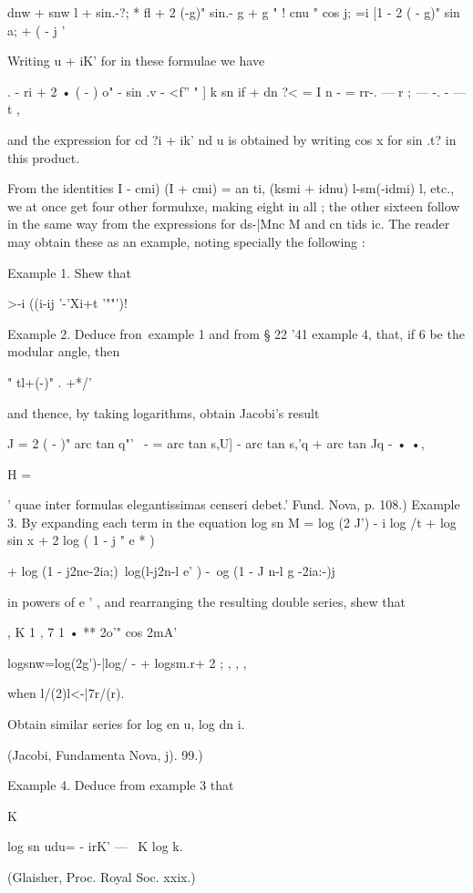 dnw + snw l + sin.-?; * fl + 2 (-g)" sin.- g + g " ! cnu " cos j; =i
[1 - 2 ( - g)" sin a; + ( - j '

Writing u + iK' for in these formulae we have

. - ri + 2 • ( - ) o" - sin .v - <f'' " ] k sn if + dn ?< = I n - =
rr-. — r ; — -. - — t ,

and the expression for cd ?i + ik' nd u is obtained by writing cos x
for sin .t? in this product.

From the identities I - cmi) (I + cmi) = an ti, (ksmi + idnu)
l-sm(-idmi) l, etc., we at once get four other formuhxe, making eight
in all ; the other sixteen follow in the same way from the expressions
for ds-|Mnc M and cn tids ic. The reader may obtain these as an
example, noting specially the following :

Example 1. Shew that

  >-i ((i-ij '-'Xi+t '""')!






Example 2. Deduce fron\ example 1 and from § 22 '41 example 4, that,
if 6 be the modular angle, then

" tl+(-)" . +*/'

and thence, by taking logarithms, obtain Jacobi's result

J = 2 ( - )" arc tan q"'~ - = arc tan s,U] - arc tan s,'q + arc tan Jq
- • •,

H =

' quae inter formulas elegantissimas censeri debet.' Fund. Nova, p.
108.) Example 3. By expanding each term in the equation log sn M = log
(2 J') - i log /t + log sin x + 2 log ( 1 - j " e * )

+ log (1 - j2ne-2ia;)\ log(l-j2n-l e' ) -\ og (1 - J n-l g -2ia:-)j

in powers of e ' , and rearranging the resulting double series, shew
that

, K 1 , 7 1 • ** 2o'" cos 2mA'

logsnw=log(2g')-|log/ - + logsm.r+ 2 ; , , ,

when l/(2)l<-|7r/(r).

Obtain similar series for log en u, log dn i.

(Jacobi, Fundamenta Nova, j). 99.)

Example 4. Deduce from example 3 that

 K

log sn udu= - irK' — \ K log k.

(Glaisher, Proc. Royal Soc. xxix.)



